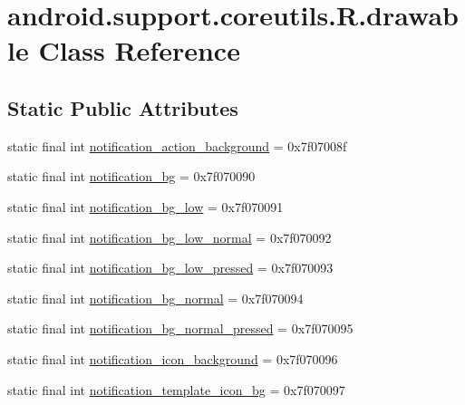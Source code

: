 \hypertarget{classandroid_1_1support_1_1coreutils_1_1R_1_1drawable}{}\section{android.\+support.\+coreutils.\+R.\+drawable Class Reference}
\label{classandroid_1_1support_1_1coreutils_1_1R_1_1drawable}
\subsection*{Static Public Attributes}
\begin{DoxyCompactItemize}
\item 
static final int \mbox{\hyperlink{classandroid_1_1support_1_1coreutils_1_1R_1_1drawable_a1e0e57eea57123962ada4e4e23c7f87f}{notification\+\_\+action\+\_\+background}} = 0x7f07008f
\item 
static final int \mbox{\hyperlink{classandroid_1_1support_1_1coreutils_1_1R_1_1drawable_a86831aa5308e6938123b94a9c4d3a35b}{notification\+\_\+bg}} = 0x7f070090
\item 
static final int \mbox{\hyperlink{classandroid_1_1support_1_1coreutils_1_1R_1_1drawable_a6b16f36ffa4bd83ee689e3071a83baef}{notification\+\_\+bg\+\_\+low}} = 0x7f070091
\item 
static final int \mbox{\hyperlink{classandroid_1_1support_1_1coreutils_1_1R_1_1drawable_ad0a7fc5f8f7762d33444ae8bed4387a0}{notification\+\_\+bg\+\_\+low\+\_\+normal}} = 0x7f070092
\item 
static final int \mbox{\hyperlink{classandroid_1_1support_1_1coreutils_1_1R_1_1drawable_a756152a03f6596872023681f768b6589}{notification\+\_\+bg\+\_\+low\+\_\+pressed}} = 0x7f070093
\item 
static final int \mbox{\hyperlink{classandroid_1_1support_1_1coreutils_1_1R_1_1drawable_a25eb67b2e64e87852fe23836ee3b6add}{notification\+\_\+bg\+\_\+normal}} = 0x7f070094
\item 
static final int \mbox{\hyperlink{classandroid_1_1support_1_1coreutils_1_1R_1_1drawable_ad97d2aae6d4170ca51500407c1d0cb5c}{notification\+\_\+bg\+\_\+normal\+\_\+pressed}} = 0x7f070095
\item 
static final int \mbox{\hyperlink{classandroid_1_1support_1_1coreutils_1_1R_1_1drawable_aac1c36b1b4016f35a539565ca5e108cd}{notification\+\_\+icon\+\_\+background}} = 0x7f070096
\item 
static final int \mbox{\hyperlink{classandroid_1_1support_1_1coreutils_1_1R_1_1drawable_a4522825b1e9785bad81fb01c404719ee}{notification\+\_\+template\+\_\+icon\+\_\+bg}} = 0x7f070097

\end{DoxyCompactItemize}
